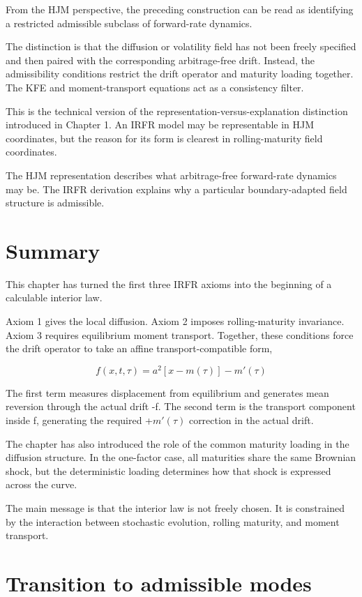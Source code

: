 \documentclass[11pt,oneside]{book}
\begin{document}
From the HJM perspective, the preceding construction can be read as
identifying a restricted admissible subclass of forward-rate dynamics.

The distinction is that the diffusion or volatility field has not been
freely specified and then paired with the corresponding arbitrage-free
drift. Instead, the admissibility conditions restrict the drift operator
and maturity loading together. The KFE and moment-transport equations
act as a consistency filter.

This is the technical version of the representation-versus-explanation
distinction introduced in Chapter 1. An IRFR model may be representable
in HJM coordinates, but the reason for its form is clearest in
rolling-maturity field coordinates.

The HJM representation describes what arbitrage-free forward-rate
dynamics may be. The IRFR derivation explains why a particular
boundary-adapted field structure is admissible.

\section{Summary}\label{summary-1}

This chapter has turned the first three IRFR axioms into the beginning
of a calculable interior law.

Axiom 1 gives the local diffusion. Axiom 2 imposes rolling-maturity
invariance. Axiom 3 requires equilibrium moment transport. Together,
these conditions force the drift operator to take an affine
transport-compatible form,

\[
f(x,t,\tau) = a^2[x-m(\tau)] - m'(\tau)
\]

The first term measures displacement from equilibrium and generates mean
reversion through the actual drift -f. The second term is the transport
component inside f, generating the required +$m'(\tau)$ correction in the
actual drift.

The chapter has also introduced the role of the common maturity loading
in the diffusion structure. In the one-factor case, all maturities share
the same Brownian shock, but the deterministic loading determines how
that shock is expressed across the curve.

The main message is that the interior law is not freely chosen. It is
constrained by the interaction between stochastic evolution, rolling
maturity, and moment transport.

\section{Transition to admissible
modes}\label{transition-to-admissible-modes}
\end{document}
